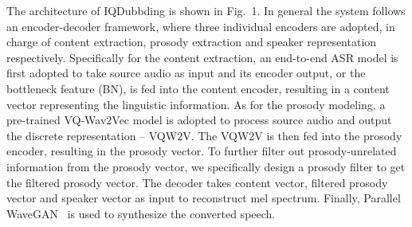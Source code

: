 \documentclass{article}
\begin{document}
The architecture of IQDubbding is shown in Fig.~1. In general the system follows an encoder-decoder framework, where three individual encoders are adopted, in charge of content extraction, prosody extraction and speaker representation respectively. Specifically for the content extraction, an end-to-end ASR model is first adopted to take source audio as input and its encoder output, or the bottleneck feature (BN), is fed into the content encoder, resulting in a content vector representing the linguistic information. As for the prosody modeling, a pre-trained VQ-Wav2Vec model is adopted to process source audio and output the discrete representation -- VQW2V. The VQW2V is then fed into the prosody encoder, resulting in the prosody vector. To further filter out prosody-unrelated information from the prosody vector, we specifically design a prosody filter to get the filtered prosody vector. The decoder takes content vector, filtered prosody vector and speaker vector as input to reconstruct mel spectrum. Finally, Parallel WaveGAN~\cite{yamamoto2020parallel} is used to synthesize the converted speech.  





\end{document}
